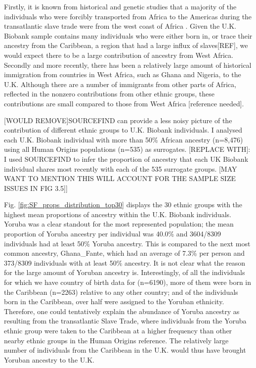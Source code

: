 {Firstly, it is known from historical and genetic studies that a majority of the individuals who were forcibly transported from Africa to the Americas during the transatlantic slave trade were from the west coast of Africa \cite{micheletti2020genetic}. Given the U.K. Biobank sample contains many individuals who were either born in, or trace their ancestry from the Caribbean, {\color{red}a region that had a large influx of slaves[REF],} we would expect there to be a large contribution of ancestry from West Africa. Secondly and more recently, there has been a relatively large amount of historical immigration from countries in West Africa, such as Ghana and Nigeria, to the U.K. Although there are a number of immigrants from other parts of Africa, reflected in the nonzero contributions from other ethnic groups, these contributions are small compared to those from West Africa [reference needed].

{\color{red}[WOULD REMOVE]SOURCEFIND can provide a less noisy picture of the contribution of different ethnic groups to U.K. Biobank individuals. I analysed each U.K. Biobank individual with more than 50\% African ancestry (n=8,476) using all Human Origins populations (n=535) as surrogates. [REPLACE WITH]: I used SOURCEFIND to infer the proportion of ancestry that each UK Biobank individual shares most recently with each of the 535 surrogate groups. [MAY WANT TO MENTION THIS WILL ACCOUNT FOR THE SAMPLE SIZE ISSUES IN FIG 3.5]]}

Fig. \ref{fig:SF_props_distribution_top30} displays the 30 ethnic groups with the highest mean proportions of ancestry within the U.K. Biobank individuals. Yoruba was a clear standout for the most represented population; the mean proportion of Yoruba ancestry per individual was 40.0\% and 3604/8309 individuals had at least 50\% Yoruba ancestry. This is compared to the next most common ancestry, Ghana\_Fante, which had an average of 7.3\% per person and 373/8309 individuals with at least 50\% ancestry. It is not clear what the reason for the large amount of Yoruban ancestry is. Interestingly, of all the individuals for which we have country of birth data for (n=6190), more of them were born in the Caribbean (n=2263) relative to any other country; and of the individuals born in the Caribbean, over half were assigned to the Yoruban ethnicity. Therefore, one could tentatively explain the abundance of Yoruba ancestry as resulting from the transatlantic Slave Trade, where individuals from the Yoruba ethnic group were taken to the Caribbean at a higher frequency than other nearby ethnic groups {\color{red}in the Human Origins reference}. The relatively large number of individuals from the Caribbean in the U.K. would thus have brought Yoruban ancestry to the U.K. 

}
